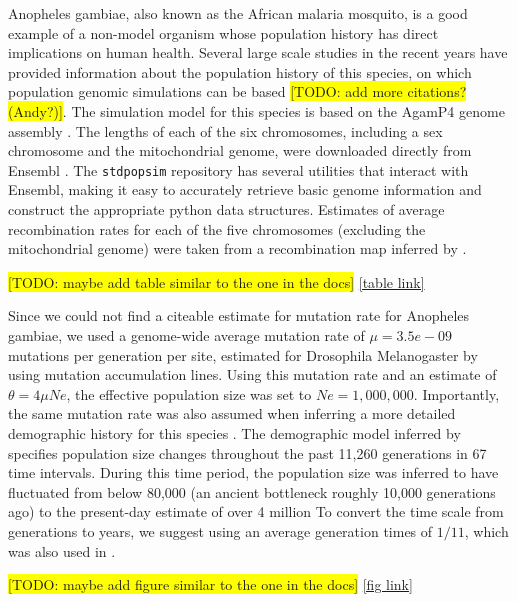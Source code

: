\documentclass[hidelinks]{article}
\begin{document}
Anopheles gambiae, also known as the African malaria mosquito, is a good example of a non-model organism whose population history has direct implications on human health. Several large scale studies in the recent years have provided information about the population history of this species, on which population genomic simulations can be based \citep{Pombi2006,Miles2017} \colorbox{yellow}{[TODO: add more citations? (Andy?)]}. The simulation model for this species is based on the AgamP4 genome assembly \citep{Sharakhova2007}. The lengths of each of the six chromosomes, including a sex chromosome and the mitochondrial genome, were downloaded directly from Ensembl \citep{ensembl2021}.
The \texttt{stdpopsim} repository has several utilities that interact with Ensembl, making it easy to accurately retrieve basic genome information and construct the appropriate python data structures.
%
%
Estimates of average recombination rates for each of the five chromosomes (excluding the mitochondrial genome) were taken from a recombination map inferred by \cite{Pombi2006}.
%

\colorbox{yellow}{[TODO:  maybe add table similar to the one in the docs]} \href{https://popsim-consortium.github.io/stdpopsim-docs/latest/catalog.html#sec_catalog_AnoGam_genome}{[table link]}

Since we could not find a citeable estimate for mutation rate for Anopheles gambiae, we used a genome-wide average mutation rate of $\mu=3.5e-09$ mutations per generation per site, estimated for Drosophila Melanogaster by \cite{Keightley2009} using mutation accumulation lines. Using this mutation rate and an estimate of $\theta=4\mu Ne$, the effective population size was set to $Ne=1,000,000$.
%
Importantly, the same mutation rate was also assumed when inferring a more detailed demographic history for this species \citep{Miles2017}. The demographic model inferred by \cite{Miles2017} specifies population size changes throughout the past 11,260 generations in 67 time intervals. During this time period, the population size was inferred to have fluctuated from below 80,000 (an ancient bottleneck roughly 10,000 generations ago) to the present-day estimate of over 4 million %
To convert the time scale from generations to years, we suggest using an average generation times of $1/11$, which was also used in \citep{Miles2017}.

\colorbox{yellow}{[TODO:  maybe add figure similar to the one in the docs]} \href{https://popsim-consortium.github.io/stdpopsim-docs/latest/_images/sec_catalog_anogam_models_gabonag1000g_1a17.png}{[fig link]}
\end{document}
